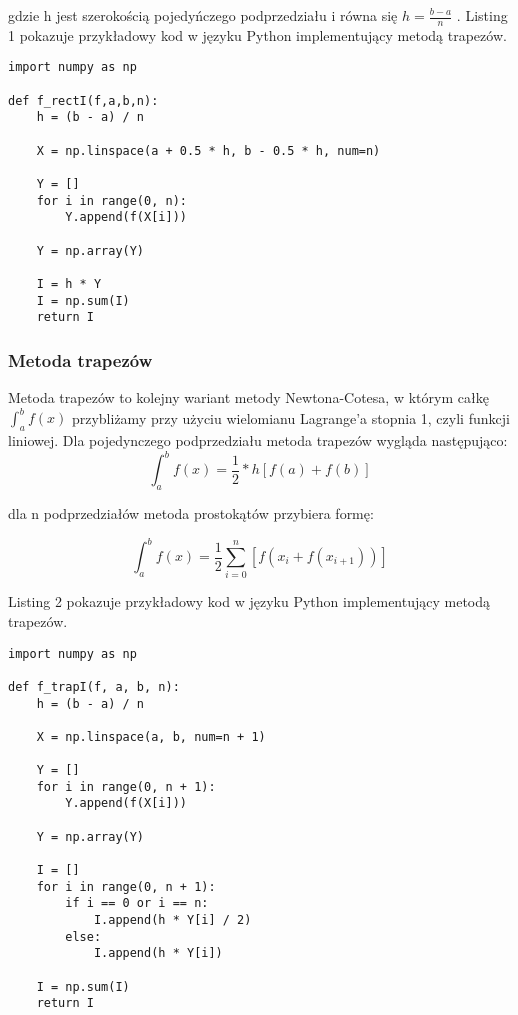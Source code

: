 \documentclass[12pt,twoside]{article}
\begin{document}
gdzie h jest szerokością pojedyńczego podprzedziału i równa się $h = \frac{b-a}{n}$ \cite{rect}.
\newline
Listing 1 pokazuje przykładowy kod w języku Python implementujący metodą trapezów.
\begin{lstlisting}[caption={Kod w języku python implementujący metodę prostokątów}]
import numpy as np

def f_rectI(f,a,b,n):
    h = (b - a) / n

    X = np.linspace(a + 0.5 * h, b - 0.5 * h, num=n)

    Y = []
    for i in range(0, n):
        Y.append(f(X[i]))

    Y = np.array(Y)

    I = h * Y
    I = np.sum(I)
    return I
\end{lstlisting}
\label{Listing 1}



\subsubsection{Metoda trapezów}
Metoda trapezów to kolejny wariant metody Newtona-Cotesa, w którym całkę $\int_a^b f(x)$ przybliżamy przy użyciu wielomianu Lagrange'a stopnia 1, czyli funkcji liniowej.
Dla pojedynczego podprzedziału metoda trapezów wygląda następująco:
\begin{equation}
\int_a^b f(x) =  \frac{1}{2}*h[f(a) + f(b)]
\label{Eq:rownanie}
\end{equation}

dla n podprzedziałów metoda prostokątów przybiera formę:

\begin{equation}
\int_a^b f(x) =  \frac{1}{2}\sum_{i=0}^n[f(x_i + f(x_{i+1}))] 
\label{Eq:rownanie}
\end{equation}

Listing 2 pokazuje przykładowy kod w języku Python implementujący metodą trapezów.

\begin{lstlisting}[caption={Kod w języku python implementujący metodę trapezów}]
import numpy as np

def f_trapI(f, a, b, n):
    h = (b - a) / n

    X = np.linspace(a, b, num=n + 1)

    Y = []
    for i in range(0, n + 1):
        Y.append(f(X[i]))

    Y = np.array(Y)

    I = []
    for i in range(0, n + 1):
        if i == 0 or i == n:
            I.append(h * Y[i] / 2)
        else:
            I.append(h * Y[i])

    I = np.sum(I)
    return I

\end{lstlisting}
\label{Listing 2}
\end{document}
